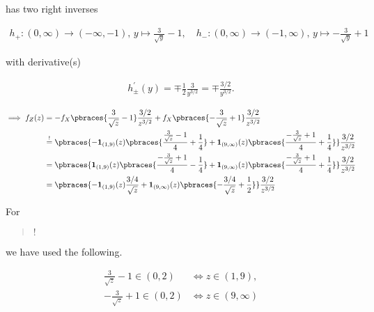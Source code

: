 \begin{solution}
\begin{enumerate}[label = (\alph*)]
    has two right inverses

    \begin{align*}
        h_+:
            (0, \infty) \to (-\infty, -1), \,
            y \mapsto \frac{3}{\sqrt y} - 1,
        \quad
        h_-:
            (0, \infty) \to (-1, \infty), \,
            y \mapsto -\frac{3}{\sqrt y} + 1
    \end{align*}

    with derivative(s)

    \begin{align*}
        h_\pm^\prime(y)
        =
        \mp \frac{1}{2} \frac{3}{y^{3 / 2}}
        =
        \mp \frac{3 / 2}{y^{3 / 2}}.
    \end{align*}

    \begin{align*}
        \implies
        f_Z(z)
        & =
        -
        f_X \pbraces{ \frac{3}{\sqrt z} - 1} \frac{3 / 2}{z^{3 / 2}}
        +
        f_X \pbraces{-\frac{3}{\sqrt z} + 1} \frac{3 / 2}{z^{3 / 2}} \\
        & \stackrel{!}{=}
        \pbraces
        {
            -
            \mathbf 1_{(1, 9)}(z)
            \pbraces
            {
                \frac{\frac{3}{\sqrt z} - 1}{4}
                +
                \frac{1}{4}
            }
            +
            \mathbf 1_{(9, \infty)}(z)
            \pbraces
            {
                \frac{-\frac{3}{\sqrt z} + 1}{4}
                +
                \frac{1}{4}
            }
        }
        \frac{3 / 2}{z^{3 / 2}} \\
        & =
        \pbraces
        {
            \mathbf 1_{(1, 9)}(z)
            \pbraces
            {
                \frac{-\frac{3}{\sqrt z} + 1}{4}
                -
                \frac{1}{4}
            }
            +
            \mathbf 1_{(9, \infty)}(z)
            \pbraces
            {
                \frac{-\frac{3}{\sqrt z} + 1}{4}
                +
                \frac{1}{4}
            }
        }
        \frac{3 / 2}{z^{3 / 2}} \\
        & =
        \pbraces
        {
            -
            \mathbf 1_{(1, 9)}(z)
            \frac{3 / 4}{\sqrt z}
            +
            \mathbf 1_{(9, \infty)}(z)
            \pbraces
            {
                -\frac{3 / 4}{\sqrt z}
                +
                \frac{1}{2}
            }
        }
        \frac{3 / 2}{z^{3 / 2}}
    \end{align*}

    For \blockquote{$!$} we have used the following.

    \begin{align*}
        \frac{3}{\sqrt z} - 1 \in (0, 2)
        & \iff
        z \in (1, 9), \\
        -\frac{3}{\sqrt z} + 1 \in (0, 2)
        & \iff
        z \in (9, \infty)
    \end{align*}

\end{enumerate}

\end{solution}

